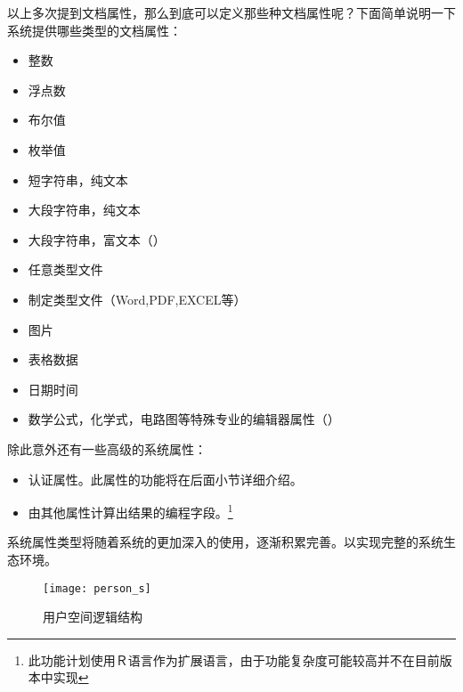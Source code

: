 以上多次提到文档属性，那么到底可以定义那些种文档属性呢？下面简单说明一下系统提供哪些类型的文档属性：
\begin{itemize}
\item 整数
\item 浮点数
\item 布尔值
\item 枚举值
\item 短字符串，纯文本
\item 大段字符串，纯文本
\item 大段字符串，富文本（\smarkdown）
\item 任意类型文件
\item 制定类型文件（Word,PDF,EXCEL等）
\item 图片
\item 表格数据
\item 日期时间
\item 数学公式，化学式，电路图等特殊专业的编辑器属性（）
\end{itemize}
除此意外还有一些高级的系统属性：
\begin{itemize}
\item 认证属性。此属性的功能将在后面小节详细介绍。
\item 由其他属性计算出结果的编程字段。\footnote{此功能计划使用Ｒ语言作为扩展语言，由于功能复杂度可能较高并不在目前版本中实现}
\end{itemize}
系统属性类型将随着系统的更加深入的使用，逐渐积累完善。以实现完整的系统生态环境。
\begin{figure}[H]
  \centering
  \texttt{[image: person\_s]}
  \caption{用户空间逻辑结构}
  \label{fig:xfig11}
\end{figure}

